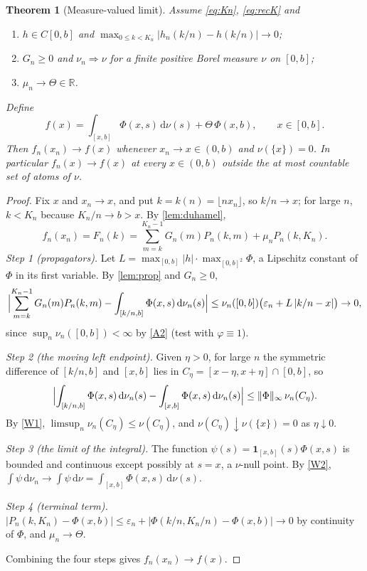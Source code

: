 \documentclass[11pt]{article}
\newtheorem{theorem}{Theorem}
\theoremstyle{definition}
\theoremstyle{remark}
\newcommand{\R}{\mathbb{R}}
\newcommand{\dd}{\,\mathrm{d}}
\newcommand{\1}{\mathbf{1}}
\newcommand{\fl}[1]{\lfloor #1\rfloor}
\newcommand{\weak}{\Rightarrow}
\begin{document}
\begin{theorem}[Measure-valued limit]\label{thm:main}
Assume \eqref{eq:Kn}, \eqref{eq:recK} and
\begin{enumerate}[label=\textup{(A\arabic*)},itemsep=1pt]
\item\label{A1} $h\in C[0,b]$ and $\max_{0\le k<K_n}|h_n(k/n)-h(k/n)|\to0$;
\item\label{A2} $G_n\ge0$ and $\nu_n\weak\nu$ for a finite positive Borel measure $\nu$ on $[0,b]$;
\item\label{A3} $\mu_n\to\Theta\in\R$.
\end{enumerate}
Define
\begin{equation}\label{eq:limit}
f(x)=\int_{[x,b]}\Phi(x,s)\dd\nu(s)+\Theta\,\Phi(x,b),\qquad x\in[0,b].
\end{equation}
Then $f_n(x_n)\to f(x)$ whenever $x_n\to x\in(0,b)$ and $\nu(\{x\})=0$. In particular
$f_n(x)\to f(x)$ at every $x\in(0,b)$ outside the at most countable set of atoms of $\nu$.
\end{theorem}

\begin{proof}
Fix $x$ and $x_n\to x$, and put $k=k(n)=\fl{nx_n}$, so $k/n\to x$; for large $n$,
$k<K_n$ because $K_n/n\to b>x$. By \cref{lem:duhamel},
\[
f_n(x_n)=F_n(k)=\sum_{m=k}^{K_n-1}G_n(m)P_n(k,m)+\mu_nP_n(k,K_n).
\]
\emph{Step 1 (propagators).} Let $L=\max_{[0,b]}|h|\cdot\max_{[0,b]^2}\Phi$, a Lipschitz constant of
$\Phi$ in its first variable. By \cref{lem:prop} and $G_n\ge0$,
\[
\Bigl|\sum_{m=k}^{K_n-1}G_n(m)P_n(k,m)-\int_{[k/n,b]}\Phi(x,s)\dd\nu_n(s)\Bigr|
\le\nu_n([0,b])\bigl(\varepsilon_n+L\,|k/n-x|\bigr)\to0,
\]
since $\sup_n\nu_n([0,b])<\infty$ by \ref{A2} (test with $\varphi\equiv1$).

\emph{Step 2 (the moving left endpoint).} Given $\eta>0$, for large $n$ the symmetric difference of
$[k/n,b]$ and $[x,b]$ lies in $C_\eta=[x-\eta,x+\eta]\cap[0,b]$, so
\[
\Bigl|\int_{[k/n,b]}\Phi(x,s)\dd\nu_n(s)-\int_{[x,b]}\Phi(x,s)\dd\nu_n(s)\Bigr|
\le\|\Phi\|_\infty\,\nu_n(C_\eta).
\]
By \ref{W1}, $\limsup_n\nu_n(C_\eta)\le\nu(C_\eta)$, and $\nu(C_\eta)\downarrow\nu(\{x\})=0$ as
$\eta\downarrow0$.

\emph{Step 3 (the limit of the integral).} The function $\psi(s)=\1_{[x,b]}(s)\Phi(x,s)$ is bounded and
continuous except possibly at $s=x$, a $\nu$-null point. By \ref{W2},
$\int\psi\dd\nu_n\to\int\psi\dd\nu=\int_{[x,b]}\Phi(x,s)\dd\nu(s)$.

\emph{Step 4 (terminal term).} $|P_n(k,K_n)-\Phi(x,b)|\le\varepsilon_n+|\Phi(k/n,K_n/n)-\Phi(x,b)|\to0$
by continuity of $\Phi$, and $\mu_n\to\Theta$.

Combining the four steps gives $f_n(x_n)\to f(x)$.
\end{proof}
\end{document}
